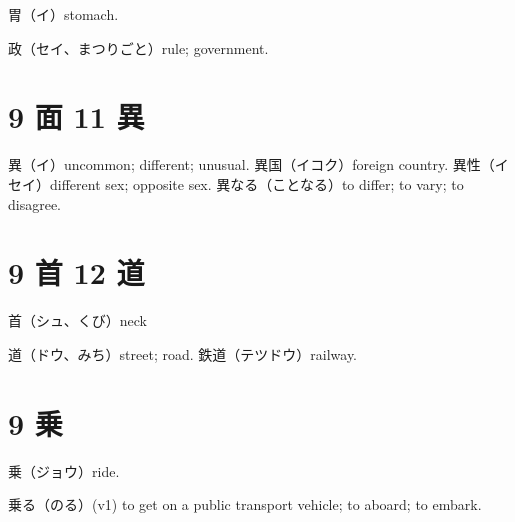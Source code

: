 胃（イ）stomach.

政（セイ、まつりごと）rule; government.

\section{9 面 11 異}

異（イ）uncommon; different; unusual.
異国（イコク）foreign country.
異性（イセイ）different sex; opposite sex.
異なる（ことなる）to differ; to vary; to disagree.

\section{9 首 12 道}

首（シュ、くび）neck

道（ドウ、みち）street; road.
鉄道（テツドウ）railway.

\section{9 乗}

乗（ジョウ）ride.

乗る（のる）(v1) to get on a public transport vehicle; to aboard; to embark.
